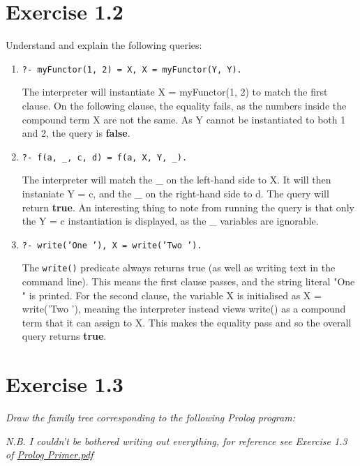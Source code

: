\documentclass{report}
\newcommand{\code}[1]{\texttt{#1}}
\begin{document}
\section{\textbf{Exercise 1.2}}
Understand and explain the following queries:
\begin{enumerate}[label=(\alph*)]

    \item \code{?- myFunctor(1, 2) = X, X = myFunctor(Y, Y).}
    
    The interpreter will instantiate X = myFunctor(1, 2) to match the first clause. On the following clause, the equality fails, as the numbers inside the compound term X are not the same. As Y cannot be instantiated to both 1 and 2, the query is \textbf{false}.

    \item \code{?- f(a, \_, c, d) = f(a, X, Y, \_).}
    
    The interpreter will match the \_ on the left-hand side to X. It will then instaniate Y = c, and the \_ on the right-hand side to d. The query will return \textbf{true}. An interesting thing to note from running the query is that only the Y = c instantiation is displayed, as the \_ variables are ignorable.

    \item \code{?- write('One '), X = write('Two ').}
    
    The \code{write()} predicate always returns true (as well as writing text in the command line). This means the first clause passes, and the string literal "One " is printed. For the second clause, the variable X is initialised as X = write('Two '), meaning the interpreter instead views write() as a compound term that it can assign to X. This makes the equality pass and so the overall query returns \textbf{true}.

\end{enumerate}

\section{\textbf{Exercise 1.3}}
\emph{Draw the family tree corresponding to the following Prolog program:}

\emph{N.B. I couldn't be bothered writing out everything, for reference see Exercise 1.3 of \href{run:./{"Prolog Primer"}.pdf}{Prolog Primer.pdf}}
\end{document}
